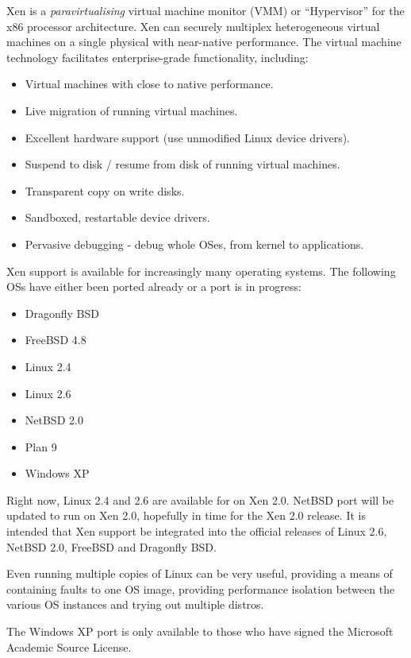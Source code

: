 \documentclass[11pt,twoside,final,openright]{xenstyle}
\begin{document}
Xen is a { \em paravirtualising } virtual machine monitor (VMM) or
``Hypervisor'' for the x86 processor architecture.  Xen can securely
multiplex heterogeneous virtual machines on a single physical with
near-native performance.  The virtual machine technology facilitates
enterprise-grade functionality, including:

\begin{itemize}
\item Virtual machines with close to native performance.
\item Live migration of running virtual machines.
\item Excellent hardware support (use unmodified Linux device drivers).
\item Suspend to disk / resume from disk of running virtual machines.
\item Transparent copy on write disks.
\item Sandboxed, restartable device drivers.
\item Pervasive debugging - debug whole OSes, from kernel to applications.
\end{itemize}

Xen support is available for increasingly many operating systems.  The
following OSs have either been ported already or a port is in
progress:
\begin{itemize}
\item Dragonfly BSD
\item FreeBSD 4.8
\item Linux 2.4
\item Linux 2.6
\item NetBSD 2.0
\item Plan 9
\item Windows XP
\end{itemize}

Right now, Linux 2.4 and 2.6 are available for on Xen 2.0.  NetBSD
port will be updated to run on Xen 2.0, hopefully in time for the Xen
2.0 release.  It is intended that Xen support be integrated into the
official releases of Linux 2.6, NetBSD 2.0, FreeBSD and Dragonfly BSD.

Even running multiple copies of Linux can be very useful, providing a
means of containing faults to one OS image, providing performance
isolation between the various OS instances and trying out multiple
distros.

The Windows XP port is only available to those who have signed the
Microsoft Academic Source License.
\end{document}
